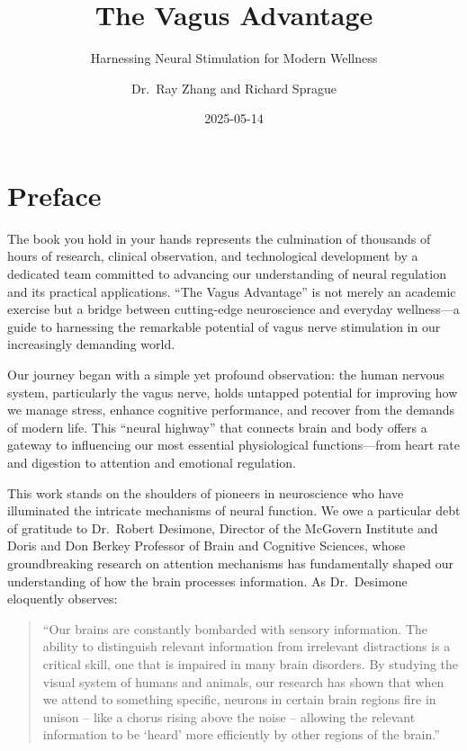 \documentclass[
  Letterpaper,
]{scrbook}
\title{The Vagus Advantage}
\subtitle{Harnessing Neural Stimulation for Modern Wellness}
\author{Dr.~Ray Zhang and Richard Sprague}
\date{2025-05-14}
\renewcommand*\contentsname{Table of contents}
\newcommand\contentsname{Table of contents}
\begin{document}
\frontmatter
\maketitle

\renewcommand*\contentsname{Table of contents}
{
\setcounter{tocdepth}{1}
\tableofcontents
}

\mainmatter
{}

\chapter*{Preface}\label{preface}


The book you hold in your hands represents the culmination of thousands
of hours of research, clinical observation, and technological
development by a dedicated team committed to advancing our understanding
of neural regulation and its practical applications. ``The Vagus
Advantage'' is not merely an academic exercise but a bridge between
cutting-edge neuroscience and everyday wellness---a guide to harnessing
the remarkable potential of vagus nerve stimulation in our increasingly
demanding world.

Our journey began with a simple yet profound observation: the human
nervous system, particularly the vagus nerve, holds untapped potential
for improving how we manage stress, enhance cognitive performance, and
recover from the demands of modern life. This ``neural highway'' that
connects brain and body offers a gateway to influencing our most
essential physiological functions---from heart rate and digestion to
attention and emotional regulation.

This work stands on the shoulders of pioneers in neuroscience who have
illuminated the intricate mechanisms of neural function. We owe a
particular debt of gratitude to Dr.~Robert Desimone, Director of the
McGovern Institute and Doris and Don Berkey Professor of Brain and
Cognitive Sciences, whose groundbreaking research on attention
mechanisms has fundamentally shaped our understanding of how the brain
processes information. As Dr.~Desimone eloquently observes:

\begin{quote}
``Our brains are constantly bombarded with sensory information. The
ability to distinguish relevant information from irrelevant distractions
is a critical skill, one that is impaired in many brain disorders. By
studying the visual system of humans and animals, our research has shown
that when we attend to something specific, neurons in certain brain
regions fire in unison -- like a chorus rising above the noise --
allowing the relevant information to be `heard' more efficiently by
other regions of the brain.''
\end{quote}
\end{document}
